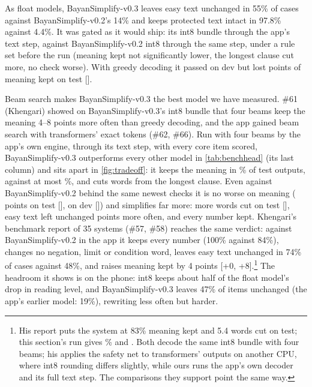 \documentclass[10pt,a4paper]{article}
\newcommand{\vTwo}{BayanSimplify-v0.2}
\newcommand{\vThree}{BayanSimplify-v0.3}
\begin{document}
\lead{\vThree{}: our best model.} As float models, \vThree{}
leaves easy text unchanged in 55\% of cases against \vTwo{}'s 14\% and keeps
protected text intact in 97.8\% against 4.4\%. It was gated as it would ship: its
int8 bundle through the app's text step, against \vTwo{} int8 through the same
step, under a rule set before the run (meaning kept not significantly lower, the
longest clause cut more, no check worse). With greedy decoding it passed on dev
but lost \mThreeTKeptAbs{} points of meaning kept on test [\mThreeTKeptCi].

Beam search makes \vThree{} the best model we have measured. \#61 (Khengari)
showed on \vThree{}'s int8 bundle that four beams keep the meaning 4--8 points more
often than greedy decoding, and the app gained beam search with transformers'
exact tokens (\#62, \#66). Run with four beams by the app's own engine, through its
text step, with every core item scored, \vThree{} outperforms every other model in
\autoref{tab:benchhead} (its last column) and sits apart in \autoref{fig:tradeoff}: it keeps the meaning in \mBeamTKept\% of test outputs,
against at most \bvHmaxKept\%, and cuts \mBeamTClause{} words from the longest
clause. Even against \vTwo{} behind the same newest checks it is no worse on
meaning (\mBeamTKeptDiff{} points on test [\mBeamTKeptCi], \mBeamKeptDiff{} on dev
[\mBeamKeptCi]) and simplifies far more: \mBeamTClauseAbs{} more words cut on test
[\mBeamTClauseCi], easy text left unchanged \mBeamTEasyAbs{} points more often, and
every number kept. Khengari's benchmark report of 35 systems (\#57, \#58) reaches
the same verdict: against \vTwo{} in the app it keeps every number (100\% against
84\%), changes no negation, limit or condition word, leaves easy text unchanged in
74\% of cases against 48\%, and raises meaning kept by 4 points [+0, +8].\footnote{His report puts the system at 83\% meaning kept and 5.4 words cut on
test; this section's run gives \mBeamTKept\% and \mBeamTClause{}. Both decode the same int8
bundle with four beams; his applies the safety net to transformers' outputs on another
CPU, where int8 rounding differs slightly, while ours runs the app's own decoder and its
full text step. The comparisons they support point the same way.} The
headroom it shows is on the phone: int8 keeps about half of the float model's
drop in reading level, and \vThree{} leaves 47\% of items unchanged (the app's earlier
model: 19\%), rewriting less often but harder.
\end{document}
